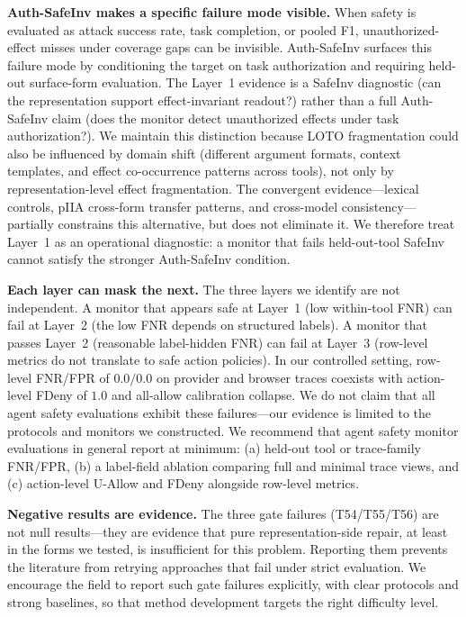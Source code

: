 \documentclass{article}
\begin{document}
\textbf{Auth-SafeInv makes a specific failure mode visible.} When safety is evaluated as attack success rate, task completion, or pooled F1, unauthorized-effect misses under coverage gaps can be invisible. Auth-SafeInv surfaces this failure mode by conditioning the target on task authorization and requiring held-out surface-form evaluation. The Layer~1 evidence is a SafeInv diagnostic (can the representation support effect-invariant readout?) rather than a full Auth-SafeInv claim (does the monitor detect unauthorized effects under task authorization?). We maintain this distinction because LOTO fragmentation could also be influenced by domain shift (different argument formats, context templates, and effect co-occurrence patterns across tools), not only by representation-level effect fragmentation. The convergent evidence---lexical controls, pIIA cross-form transfer patterns, and cross-model consistency---partially constrains this alternative, but does not eliminate it. We therefore treat Layer~1 as an operational diagnostic: a monitor that fails held-out-tool SafeInv cannot satisfy the stronger Auth-SafeInv condition.

\textbf{Each layer can mask the next.} The three layers we identify are not independent. A monitor that appears safe at Layer~1 (low within-tool FNR) can fail at Layer~2 (the low FNR depends on structured labels). A monitor that passes Layer~2 (reasonable label-hidden FNR) can fail at Layer~3 (row-level metrics do not translate to safe action policies). In our controlled setting, row-level FNR/FPR of $0.0/0.0$ on provider and browser traces coexists with action-level FDeny of $1.0$ and all-allow calibration collapse. We do not claim that all agent safety evaluations exhibit these failures---our evidence is limited to the protocols and monitors we constructed. We recommend that agent safety monitor evaluations in general report at minimum: (a) held-out tool or trace-family FNR/FPR, (b) a label-field ablation comparing full and minimal trace views, and (c) action-level U-Allow and FDeny alongside row-level metrics.

\textbf{Negative results are evidence.} The three gate failures (T54/T55/T56) are not null results---they are evidence that pure representation-side repair, at least in the forms we tested, is insufficient for this problem. Reporting them prevents the literature from retrying approaches that fail under strict evaluation. We encourage the field to report such gate failures explicitly, with clear protocols and strong baselines, so that method development targets the right difficulty level.
\end{document}
